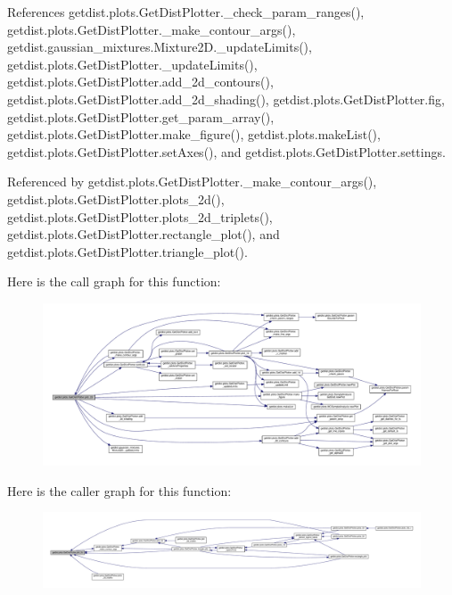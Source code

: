 References getdist.\+plots.\+Get\+Dist\+Plotter.\+\_\+check\+\_\+param\+\_\+ranges(), getdist.\+plots.\+Get\+Dist\+Plotter.\+\_\+make\+\_\+contour\+\_\+args(), getdist.\+gaussian\+\_\+mixtures.\+Mixture2\+D.\+\_\+update\+Limits(), getdist.\+plots.\+Get\+Dist\+Plotter.\+\_\+update\+Limits(), getdist.\+plots.\+Get\+Dist\+Plotter.\+add\+\_\+2d\+\_\+contours(), getdist.\+plots.\+Get\+Dist\+Plotter.\+add\+\_\+2d\+\_\+shading(), getdist.\+plots.\+Get\+Dist\+Plotter.\+fig, getdist.\+plots.\+Get\+Dist\+Plotter.\+get\+\_\+param\+\_\+array(), getdist.\+plots.\+Get\+Dist\+Plotter.\+make\+\_\+figure(), getdist.\+plots.\+make\+List(), getdist.\+plots.\+Get\+Dist\+Plotter.\+set\+Axes(), and getdist.\+plots.\+Get\+Dist\+Plotter.\+settings.



Referenced by getdist.\+plots.\+Get\+Dist\+Plotter.\+\_\+make\+\_\+contour\+\_\+args(), getdist.\+plots.\+Get\+Dist\+Plotter.\+plots\+\_\+2d(), getdist.\+plots.\+Get\+Dist\+Plotter.\+plots\+\_\+2d\+\_\+triplets(), getdist.\+plots.\+Get\+Dist\+Plotter.\+rectangle\+\_\+plot(), and getdist.\+plots.\+Get\+Dist\+Plotter.\+triangle\+\_\+plot().

Here is the call graph for this function\+:
\nopagebreak
\begin{figure}[H]
\begin{center}
\leavevmode
\includegraphics[width=350pt]{classgetdist_1_1plots_1_1GetDistPlotter_a4a4a4bee3e0232eb2089b2f9b0006909_cgraph}
\end{center}
\end{figure}
Here is the caller graph for this function\+:
\nopagebreak
\begin{figure}[H]
\begin{center}
\leavevmode
\includegraphics[width=350pt]{classgetdist_1_1plots_1_1GetDistPlotter_a4a4a4bee3e0232eb2089b2f9b0006909_icgraph}
\end{center}
\end{figure}
\mbox{\label{classgetdist_1_1plots_1_1GetDistPlotter_a20064a0721aea40476598a5a3a20df01}} 
